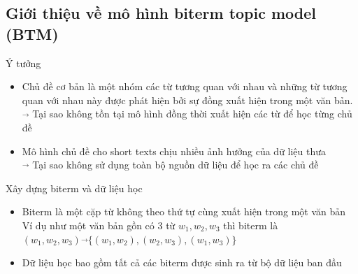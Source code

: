 \documentclass[pdf]{beamer}
\begin{document}
\subsection{Giới thiệu về mô hình biterm topic model (BTM)}
\begin{frame}{Ý tưởng}
	\begin{itemize}
		\item Chủ đề cơ bản là một nhóm các từ tương quan với nhau và những từ tương quan với nhau này được phát hiện bởi sự đồng xuất hiện trong một văn bản.  \\
		$\overrightarrow{} $ Tại sao không tồn tại mô hình đồng thời xuất hiện các từ để học từng chủ đề
		\item Mô hình chủ đề cho short texts chịu nhiều ảnh hưởng của dữ liệu thưa \\
		$\overrightarrow{} $  Tại sao không sử dụng toàn bộ nguồn dữ liệu để học ra các chủ đề
	\end{itemize}
\end{frame}

\begin{frame}{Xây dựng biterm và dữ liệu học}
	\begin{itemize}
		\item Biterm là một cặp từ không theo thứ tự cùng xuất hiện trong một văn bản \\
		\centering Ví dụ như một văn bản gồn có 3 từ $w_1, w_2, w_3$ thì biterm là \\
		\centering $(w_1, w_2, w_3) \overrightarrow{} \{(w_1, w_2), (w_2, w_3), (w_1, w_3)\} $
		\item Dữ liệu học bao gồm tất cả các biterm được sinh ra từ bộ dữ liệu ban đầu
	\end{itemize}
\end{frame}
\end{document}
